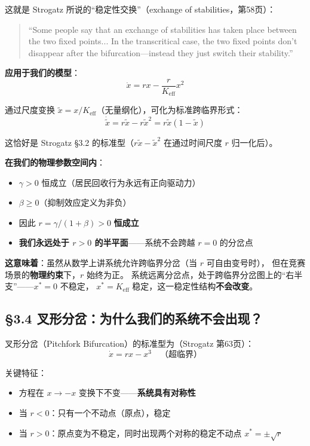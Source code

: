 \documentclass[12pt,a4paper]{article}
\begin{document}
这就是 Strogatz 所说的``稳定性交换''（exchange of stabilities，第58页）：

\begin{quote}
\small
``Some people say that an exchange of stabilities has taken place between the two fixed points...
In the transcritical case, the two fixed points don't disappear after the bifurcation—instead
they just switch their stability.''
\end{quote}

\textbf{应用于我们的模型}：
\begin{equation}
\dot{x} = r x - \frac{r}{K_{\text{eff}}} x^2
\end{equation}

通过尺度变换 $\tilde{x} = x / K_{\text{eff}}$（无量纲化），可化为标准跨临界形式：
\begin{equation}
\dot{\tilde{x}} = r \tilde{x} - r \tilde{x}^2 = r \tilde{x}(1 - \tilde{x})
\end{equation}

这恰好是 Strogatz \S3.2 的标准型（$r\tilde{x} - \tilde{x}^2$ 在通过时间尺度 $r$ 归一化后）。

\textbf{在我们的物理参数空间内}：
\begin{itemize}
  \item $\gamma > 0$ 恒成立（居民回收行为永远有正向驱动力）
  \item $\beta \geq 0$（抑制效应定义为非负）
  \item 因此 $r = \gamma/(1+\beta) > 0$ \textbf{恒成立}
  \item \textbf{我们永远处于 $r > 0$ 的半平面}——系统不会跨越 $r = 0$ 的分岔点
\end{itemize}

\textbf{这意味着}：虽然从数学上讲系统允许跨临界分岔（当 $r$ 可自由变号时），
但在竞赛场景的\textbf{物理约束}下，$r$ 始终为正。
系统远离分岔点，处于跨临界分岔图上的``右半支''——$x^* = 0$ 不稳定，
$x^* = K_{\text{eff}}$ 稳定，这一稳定性结构\textbf{不会改变}。

\subsection{\S3.4 叉形分岔：为什么我们的系统不会出现？}

叉形分岔（Pitchfork Bifurcation）的标准型为（Strogatz 第63页）：
\begin{equation}
\dot{x} = r x - x^3 \quad \text{（超临界）}
\end{equation}

关键特征：
\begin{itemize}
  \item 方程在 $x \to -x$ 变换下不变——\textbf{系统具有对称性}
  \item 当 $r < 0$：只有一个不动点（原点），稳定
  \item 当 $r > 0$：原点变为不稳定，同时出现两个对称的稳定不动点 $x^* = \pm\sqrt{r}$
\end{itemize}
\end{document}
